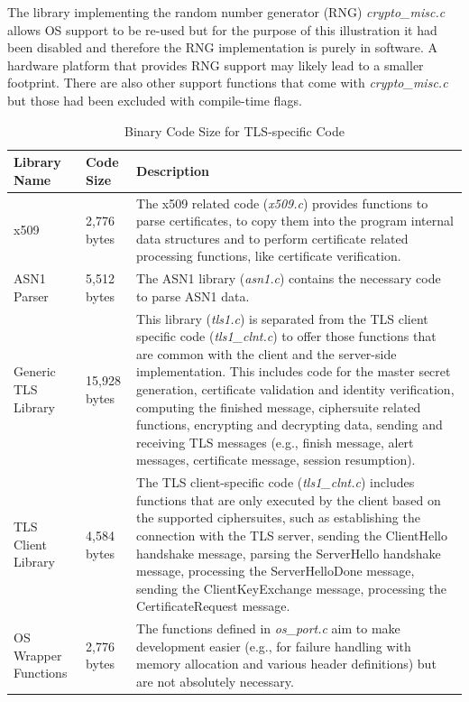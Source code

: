 \documentclass[a4paper, 10pt]{IEEEtran}
\begin{document}
The library implementing the random number generator (RNG) \textit{crypto\_misc.c} allows OS support to be re-used but for the purpose of this illustration it had been disabled and therefore the RNG implementation is purely in software. A hardware platform that provides RNG support may likely lead to a smaller footprint. There are also other support functions that come with \textit{crypto\_misc.c} but those had been excluded with compile-time flags.

\begin{table}[htdp]
\caption{Binary Code Size for TLS-specific Code}
\begin{center}
\begin{tabular}{|p{1cm}|p{}|p{}|}
\hline
\textbf{Library Name} & \textbf{Code Size} & \textbf{Description} \\
\hline\hline
x509& 2,776 bytes & The x509 related code (\textit{x509.c}) provides functions to parse certificates, to copy them into the program internal data structures and to perform certificate related processing functions, like certificate verification.\\ 
\hline\hline
ASN1 Parser & 5,512 bytes & The ASN1 library (\textit{asn1.c}) contains the necessary code to parse ASN1 data.\\ 
\hline\hline
Generic TLS Library & 15,928 bytes & This library (\textit{tls1.c}) is separated from the TLS client specific code (\textit{tls1\_clnt.c}) to offer those functions that are common with the client and the server-side implementation. This includes code for the master secret generation, certificate validation and identity verification, computing the finished message, ciphersuite related functions, encrypting and decrypting data, sending and receiving TLS messages (e.g., finish message, alert messages, certificate message, session resumption).\\ 
\hline\hline
TLS Client Library & 4,584 bytes & The TLS client-specific code (\textit{tls1\_clnt.c}) includes functions that are only executed by the client based on the supported ciphersuites, such as establishing the connection with the TLS server, sending the ClientHello handshake message, parsing the ServerHello handshake message, processing the ServerHelloDone message, sending the ClientKeyExchange message, processing the CertificateRequest message. \\ 
\hline\hline
OS Wrapper Functions & 2,776 bytes & The functions defined in \textit{os\_port.c} aim to make development easier (e.g., for failure handling with memory allocation and various header definitions) but are not absolutely necessary.\\ 

\end{tabular}
\end{center}
\end{table}
\end{document}

